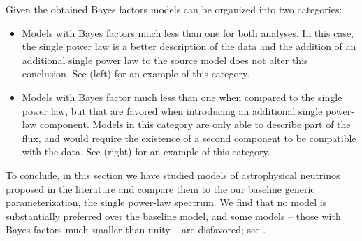 Given the obtained Bayes factors models can be organized into two categories:
\begin{itemize}
	\item Models with Bayes factors much less than one for both analyses.
	In this case, the single power law is a better description of the data and the addition of an additional single power law to the source model does not alter this conclusion.
	See  (left) for an example of this category.
	\item Models with Bayes factor much less than one when compared to the single power law, but that are favored when introducing an additional single power-law component.
	Models in this category are only able to describe part of the flux, and would require the existence of a second component to be compatible with the data.
	See  (right) for an example of this category.
\end{itemize}
To conclude, in this section we have studied models of astrophysical neutrinos proposed in the literature and compare them to the our baseline generic parameterization, the single power-law spectrum.
We find that no model is substantially preferred over the baseline model, and some models -- those with Bayes factors much smaller than unity -- are disfavored; see .

